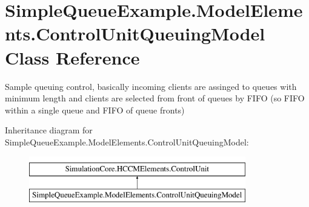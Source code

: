 \hypertarget{class_simple_queue_example_1_1_model_elements_1_1_control_unit_queuing_model}{}\section{Simple\+Queue\+Example.\+Model\+Elements.\+Control\+Unit\+Queuing\+Model Class Reference}
\label{class_simple_queue_example_1_1_model_elements_1_1_control_unit_queuing_model}


Sample queuing control, basically incoming clients are assinged to queues with minimum length and clients are selected from front of queues by F\+I\+FO (so F\+I\+FO within a single queue and F\+I\+FO of queue fronts)  


Inheritance diagram for Simple\+Queue\+Example.\+Model\+Elements.\+Control\+Unit\+Queuing\+Model\+:\begin{figure}[H]
\begin{center}
\leavevmode
\includegraphics[height=2.000000cm]{class_simple_queue_example_1_1_model_elements_1_1_control_unit_queuing_model}
\end{center}
\end{figure}
